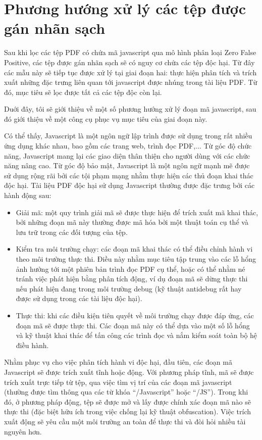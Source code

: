 \documentclass[./../main.tex]{subfiles}
\begin{document}
\section{Phương hướng xử lý các tệp được gán nhãn sạch}
Sau khi lọc các tệp PDF có chứa mã javascript qua mô hình phân loại Zero False Positive, các tệp được gán nhãn sạch sẽ có nguy cơ chứa các tệp độc hại. Từ đây các mẫu này sẽ tiếp tục được xử lý tại giai đoạn hai: thực hiện phân tích và trích xuất những đặc trưng liên quan tới javascript được nhúng trong tài liệu PDF. Từ đó, mục tiêu sẽ lọc được tất cả các tệp độc còn lại.

Duới đây, tôi sẽ giới thiệu về một số phương hướng xử lý đoạn mã javascript, sau đó giới thiệu về một công cụ phục vụ mục tiêu của giai đoạn này.


Có thể thấy, Javascript là một ngôn ngữ lập trình được sử dụng trong rất nhiều ứng dụng khác nhau, bao gồm các trang web, trình đọc PDF,... Từ góc độ chức năng, Javascript mang lại các giao diện thân thiện cho người dùng với các chức năng nâng cao. Từ góc độ bảo mật, Javascript là một ngôn ngữ mạnh mẽ được sử dụng rộng rãi bởi các tội phạm mạng nhằm thực hiện các thủ đoạn khai thác độc hại.
Tài liệu PDF độc hại sử dụng Javascript thường được đặc trưng bởi các hành động sau:
\begin{itemize}
	\item Giải mã: một quy trình giải mã sẽ được thực hiện để trích xuất mã khai thác, bởi những đoạn mã này thường được mã hóa bởi một thuật toán cụ thể và lưu trữ trong các đối tượng của tệp.
	\item Kiểm tra môi trường chạy: các đoạn mã khai thác có thể điều chỉnh hành vi theo môi trường thực thi. Điều này nhằm mục tiêu tập trung vào các lỗ hổng ảnh hưởng tới một phiên bản trình đọc PDF cụ thể, hoặc có thể nhằm né tránh việc phát hiện bằng phân tích động, ví dụ đoạn mã sẽ dừng thực thi nếu phát hiện đang trong môi trường debug (kỹ thuật antidebug rất hay được sử dụng trong các tài liệu độc hại).
	\item Thực thi: khi các điều kiện tiên quyết về môi trường chạy được đáp ứng, các đoạn mã sẽ được thực thi. Các đoạn mã này có thể dựa vào một số lỗ hổng và kỹ thuật khai thác để tấn công các trình đọc và nắm kiểm soát toàn bộ hệ điều hành.
\end{itemize}

Nhằm phục vụ cho việc phân tích hành vi độc hại, đầu tiên, các đoạn mã Javascript sẽ được trích xuất tĩnh hoặc động. Với phương pháp tĩnh, mã sẽ được trích xuất trực tiếp từ tệp, qua việc tìm vị trí của các đoạn mã javascript (thường được tìm thông qua các từ khóa “/Javascript” hoặc “/JS”). Trong khi đó, ở phương pháp động, tệp sẽ được mở và lấy được chính xác đoạn mã nào sẽ thực thi (đặc biệt hữu ích trong việc chống lại kỹ thuật obfuscation). Việc trích xuất động sẽ yêu cầu một môi trường an toàn để thực thi và đòi hỏi nhiều tài nguyên hơn.
\end{document}
